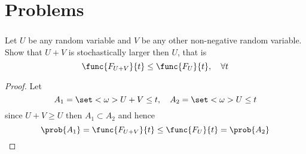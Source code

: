 \chapter{Problems}
\subsection{}
Let \(U\) be any random variable and \(V\) be any other non-negative random variable. Show that \(U + V\) is stochastically larger then \(U\), that is 
\begin{equation}
    \func{F_{U+V}}{t} \leq \func{F_U}{t}, \quad \forall t
\end{equation}
\begin{proof}
    Let
    \begin{equation*}
        A_1 = \set<\omega>{U + V \leq t} , \quad A_2 = \set<\omega>{U \leq t}
    \end{equation*}
    since \(U + V \geq U\) then \(A_1 \subset A_2\) and hence 
    \begin{equation*}
        \prob{A_1} = \func{F_{U+V}}{t} \leq \func{F_U}{t} = \prob{A_2}
    \end{equation*}
\end{proof}